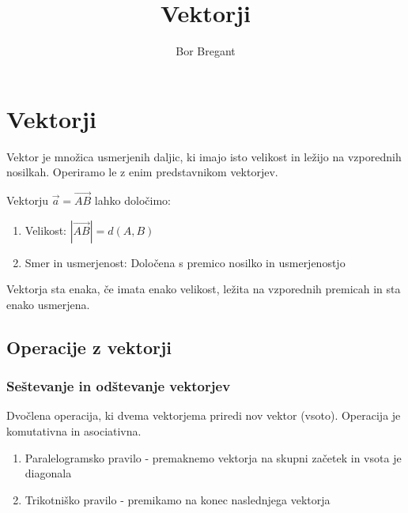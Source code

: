 \documentclass{article}
\title{\vspace{-2.0cm}Vektorji}
\author{Bor Bregant}
\date{\vspace{-5ex}}
\begin{document}
\maketitle

\section{Vektorji}

Vektor je množica usmerjenih daljic, ki imajo isto velikost in ležijo na vzporednih nosilkah. Operiramo le z enim predstavnikom vektorjev.

Vektorju $\vec{a}=\vec{AB}$ lahko določimo:

\begin{enumerate}[i]
    \item Velikost: $|\vec{AB}|=d(A,B)$
    \item Smer in usmerjenost: Določena s premico nosilko in usmerjenostjo
\end{enumerate}

Vektorja sta enaka, če imata enako velikost, ležita na vzporednih premicah in sta enako usmerjena.

\subsection*{Operacije z vektorji}

\subsubsection*{Seštevanje in odštevanje vektorjev}

Dvočlena operacija, ki dvema vektorjema priredi nov vektor (vsoto). Operacija je komutativna in asociativna.

\begin{enumerate}[i]
    \item Paralelogramsko pravilo - premaknemo vektorja na skupni začetek in vsota je diagonala
    \item Trikotniško pravilo - premikamo na konec naslednjega vektorja
\end{enumerate}
\end{document}
